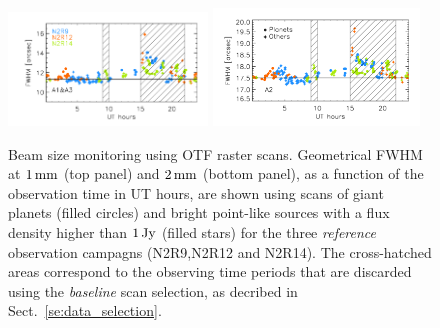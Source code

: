 \begin{figure}[ht!]
  \begin{center}
    \includegraphics[clip=true, trim={0.9cm, 0.5cm, 0.5cm, 0.5cm}, width=0.4725\textwidth]{Figures/Beam_monitoring_with_otfs_vs_ut_1mm.pdf}
    \includegraphics[clip=true, trim={0.5cm, 0.5cm, 0.5cm, 0.5cm}, width=0.4875\textwidth]{Figures/Beam_monitoring_with_otfs_vs_ut_a2.pdf}
    \caption[Beam size monitoring using OTF scans]{Beam size
      monitoring using OTF raster scans. Geometrical FWHM at $1\,\rm{mm}$ (top panel)
      and $2\,\rm{mm}$ (bottom panel), as a function of the
      observation time in UT hours, are shown using scans of giant
      planets (filled circles) and bright point-like sources with a
      flux density higher than $1\,\rm{Jy}$ (filled stars) for the three \emph{reference}
      observation campagns (N2R9,N2R12 and N2R14). The cross-hatched areas
      correspond to the observing time periods that are discarded using
      the \emph{baseline} scan selection, as decribed in Sect.~\ref{se:data_selection}.} 
\label{fig:beam_monitoring_otf}
  \end{center}
\end{figure}


